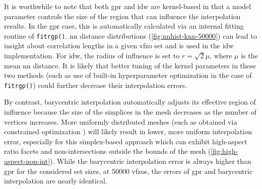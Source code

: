 \documentclass[final,twocolumn,12pt]{elsarticle}
\newcommand{\matlab}[1]{\mbox{\lstinline[style=Matlab-editor]{#1}}}
\begin{document}
It is worthwhile to note that both \gls{gpr} and \gls{idw} are kernel-based in that a model parameter controls the size of the region that can influence the interpolation results. In the \gls{gpr} case, this is automatically calculated via an internal fitting routine of \matlab{fitrgp()}. \gls{nn} distance distributions (\cref{fig:nnhist-knn-50000}) can lead to insight about correlation lengths in a given \gls{vfzo} set and is used in the \gls{idw} implementation. For \gls{idw}, the radius of influence is set to $r=\sqrt{2} \mu$, where $\mu$ is the mean \gls{nn} distance. It is likely that better tuning of the kernel parameters in these two methods (such as use of built-in hyperparameter optimization in the case of \matlab{fitrgp()}) could further decrease their interpolation errors.

By contrast, barycentric interpolation automatically adjusts its effective region of influence because the size of the simplices in the mesh decreases as the number of vertices increases. More uniformly distributed meshes (such as obtained via constrained optimization \cite{dolanBenchmarkingOptimizationSoftware2004,ConstrainedElectrostaticNonlinear2020}) will likely result in lower, more uniform interpolation error, especially for this simplex-based approach which can exhibit high-aspect ratio facets and non-intersections outside the bounds of the mesh (\cref{fig:high-aspect-non-int}). While the barycentric interpolation error is always higher than \gls{gpr} for the considered set sizes, at \num{50000} \glspl{vfzo}, the errors of \gls{gpr} and barycentric interpolation are nearly identical. %

\end{document}
